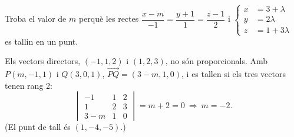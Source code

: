 \begin{apartats}
\begin{nomesllarg}
Troba el valor de $m$ perquè les rectes $\dfrac{x-m}{-1}=\dfrac{y+1}{1}=\dfrac{z-1}{2}$ i
$\left\{\begin{aligned}x&=3+\lambda\\y&=2\lambda\\z&=1+3\lambda\end{aligned}\right.$ es tallin en un punt.

\begin{solucio}
Els vectors directors, $(-1,1,2)$ i $(1,2,3)$, no són proporcionals. Amb $P(m,-1,1)$ i $Q(3,0,1)$,
$\overrightarrow{PQ}=(3-m,1,0)$, i es tallen si els tres vectors tenen rang 2:
\[
\begin{vmatrix}-1&1&2\\1&2&3\\3-m&1&0\end{vmatrix}=m+2=0\ \Longrightarrow\ m=-2.
\]
(El punt de tall és $(1,-4,-5)$.)
\end{solucio}
\end{nomesllarg}

\end{apartats}
